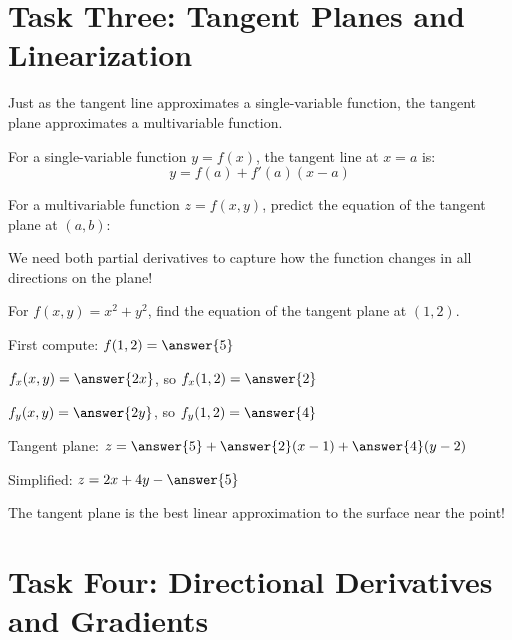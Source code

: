 \documentclass{ximera}
\begin{document}
\section*{Task Three: Tangent Planes and Linearization}

Just as the tangent line approximates a single-variable function, the tangent plane approximates a multivariable function.

\begin{problem}
For a single-variable function $y = f(x)$, the tangent line at $x = a$ is:
$$y = f(a) + f'(a)(x - a)$$

For a multivariable function $z = f(x, y)$, predict the equation of the tangent plane at $(a, b)$:

\begin{multipleChoice}
\end{multipleChoice}

\begin{feedback}
We need both partial derivatives to capture how the function changes in all directions on the plane!
\end{feedback}
\end{problem}

\begin{problem}
For $f(x, y) = x^2 + y^2$, find the equation of the tangent plane at $(1, 2)$.

First compute:
$f(1, 2) = \answer{5}$

$f_x(x, y) = \answer{2x}$, so $f_x(1, 2) = \answer{2}$

$f_y(x, y) = \answer{2y}$, so $f_y(1, 2) = \answer{4}$

Tangent plane: $z = \answer{5} + \answer{2}(x - 1) + \answer{4}(y - 2)$

Simplified: $z = 2x + 4y - \answer{5}$

\begin{feedback}
The tangent plane is the best linear approximation to the surface near the point!
\end{feedback}
\end{problem}

\section*{Task Four: Directional Derivatives and Gradients}
\end{document}
